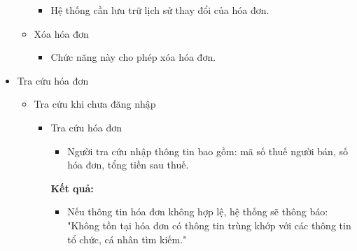 \begin{itemize}
\begin{itemize}
\begin{itemize}
                        \item Hệ thống cần lưu trữ lịch sử thay đổi của hóa đơn.

                    \end{itemize}




              \item Xóa hóa đơn

                    \begin{itemize}

                        \item Chức năng này cho phép xóa hóa đơn.

                    \end{itemize}

          \end{itemize}

    \item Tra cứu hóa đơn

          \begin{itemize}

              \item Tra cứu khi chưa đăng nhập

                    \begin{itemize}

                        \item Tra cứu hóa đơn

                              \begin{itemize}

                                  \item Người tra cứu nhập thông tin bao gồm: mã số thuế người bán, số hóa đơn, tổng tiền sau thuế.

                              \end{itemize}

                              \textbf{Kết quả:}

                              \begin{itemize}

                                  \item Nếu thông tin hóa đơn không hợp lệ, hệ thống sẽ thông báo: "Không tồn tại hóa đơn có thông tin trùng khớp với các thông tin tổ chức, cá nhân tìm kiếm." %


\end{itemize}
\end{itemize}
\end{itemize}
\end{itemize}
